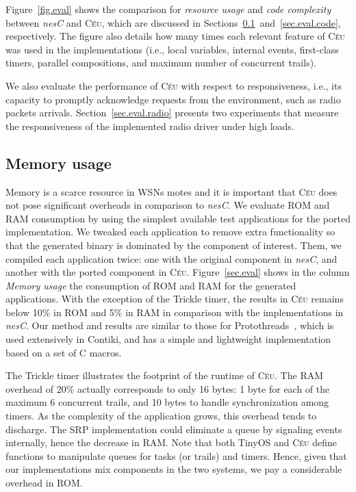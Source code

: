 \documentclass[10pt]{sensys-proc}
\newcommand{\CEU}{\textsc{C\'{e}u}\xspace}
\begin{document}
Figure~\ref{fig.eval} shows the comparison for \emph{resource usage} and 
\emph{code complexity} between \emph{nesC} and \CEU, which are discussed in
Sections~\ref{sec.eval.resource}~and~\ref{sec.eval.code}, respectively.
The figure also details how many times each relevant feature of \CEU was used 
in the implementations (i.e., local variables, internal events, first-class 
timers, parallel compositions, and maximum number of concurrent trails).

We also evaluate the performance of \CEU with respect to responsiveness, i.e., 
its capacity to promptly acknowledge requests from the environment, such as 
radio packets arrivals.
Section~\ref{sec.eval.radio} presents two experiments that measure the 
responsiveness of the implemented radio driver under high loads.

\subsection{Memory usage}
\label{sec.eval.resource}

Memory is a scarce resource in WSNs motes and it is important that \CEU does 
not pose significant overheads in comparison to \emph{nesC}.
%
We evaluate ROM and RAM consumption by using the simplest available test 
applications for the ported implementation.
We tweaked each application to remove extra functionality so that the generated 
binary is dominated by the component of interest.
Them, we compiled each application twice: one with the original component in 
\emph{nesC}, and another with the ported component in \CEU.
%
Figure~\ref{sec.eval} shows in the column \emph{Memory usage} the consumption 
of ROM and RAM for the generated applications.
With the exception of the Trickle timer, the results in \CEU remains below 10\% 
in ROM and 5\% in RAM in comparison with the implementations in \emph{nesC}.
%
Our method and results are similar to those for
Protothreads~\cite{wsn.protothreads}, which is used extensively in Contiki, and 
has a simple and lightweight implementation based on a set of C macros.

The Trickle timer illustrates the footprint of the runtime of \CEU.
The RAM overhead of 20\% actually corresponds to only 16 bytes: 1 byte for each 
of the maximum 6 concurrent trails, and 10 bytes to handle synchronization 
among timers.
%
As the complexity of the application grows, this overhead tends to discharge.
%
The SRP implementation could eliminate a queue by signaling events internally, 
hence the decrease in RAM.
%
Note that both TinyOS and \CEU define functions to manipulate queues for tasks 
(or trails) and timers.
Hence, given that our implementations mix components in the two systems, we pay 
a considerable overhead in ROM.
\end{document}
